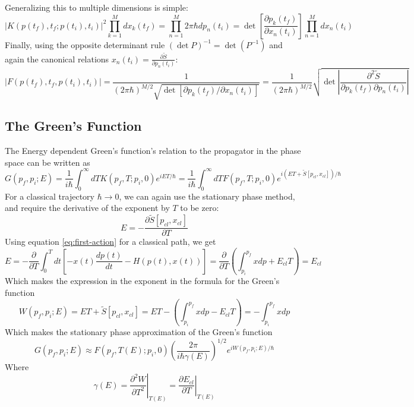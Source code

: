 \documentclass{article}
\begin{document}
Generalizing this to multiple dimensions is simple:
\begin{equation}
    \left| K(p(t_f), t_f ; p(t_i), t_i)\right|^2 \prod_{k=1}^M dx_k(t_f) = \prod_{n=1}^M 2\pi\hbar dp_n(t_i) = \det\left[\frac{\partial p_k(t_f)}{\partial x_n(t_i)}\right] \prod_{n=1}^M dx_n(t_i)
\end{equation}
Finally, using the opposite determinant rule $(\det P)^{-1} = \det (P^{-1})$ and again the canonical relations $x_n(t_i) = \frac{\partial \tilde{S}}{\partial p_n(t_i)}$:
\begin{equation}
    \left|F(p(t_f), t_f, p(t_i), t_i)\right| = \frac{1}{\left(2\pi\hbar\right)^{M/2}\sqrt{\det\left[\partial p_k(t_f)/\partial x_n (t_i)\right]}} = \frac{1}{\left(2\pi\hbar\right)^{M/2}}\sqrt{\det \left|\frac{\partial^2 \tilde{S}}{\partial p_k(t_f)\partial p_n(t_i)}\right|}
\end{equation}
\subsection{The Green's Function}
The Energy dependent Green's function's relation to the propagator in the phase space can be written as
\begin{equation}
    G(p_f,p_i;E) = \frac{1}{i\hbar}\int_0^\infty dT K\left(p_f,T;p_i,0\right)e^{iET/\hbar} = \frac{1}{i\hbar}\int_0^\infty dT F\left(p_f,T;p_i,0\right)e^{i\left(ET + \tilde{S}\left[p_{cl},x_{cl}\right]\right)/\hbar}
\end{equation}
For a classical trajectory $\hbar \rightarrow 0$, we can again use the stationary phase method, and require the derivative of the exponent by $T$ to be zero:
\begin{equation}
    E = -\frac{\partial \tilde{S}[p_{cl},x_{cl}]}{\partial T}
\end{equation}
Using equation \ref{eq:first-action} for a classical path, we get
\begin{equation}
    E = -\frac{\partial}{\partial T}
        \int_0^T dt \left[-x(t) \frac{dp(t)}{dt} - H(p(t), x(t))\right] = \frac{\partial}{\partial T}\left(\int_{p_i}^{p_f}xdp + E_{cl} T\right) = E_{cl}
\end{equation}
Which makes the expression in the exponent in the formula for the Green's function
\begin{equation}
    W(p_f, p_i ; E) = ET + \tilde{S}\left[p_{cl},x_{cl}\right] = ET - \left(\int_{p_i}^{p_f}xdp - E_{cl} T\right) = - \int_{p_i}^{p_f}xdp
\end{equation}
Which makes the stationary phase approximation of the Green's function
\begin{equation}
    G(p_f, p_i;E) \approx F(p_f, T(E); p_i, 0)\left(\frac{2\pi}{i\hbar \gamma(E)}\right)^{1/2}e^{i W(p_f, p_i ; E)/\hbar}
\end{equation}
Where
\begin{equation}
    \gamma(E) = \left.\frac{\partial^2 W}{\partial T^2}\right|_{T(E)} = \left.\frac{\partial E_{cl}}{\partial T}\right|_{T(E)}
\end{equation}
\end{document}
